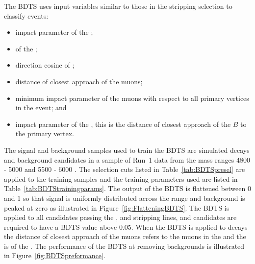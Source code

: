 The BDTS uses input variables similar to those in the stripping selection to classify events:
\begin{itemize}
\item impact parameter \chisqd of the \bsd;
\item \chivtx of the \bsd;
\item direction cosine of \bsd;
\item distance of closest approach of the muons;
\item minimum impact parameter \chisqd of the muons with respect to all primary vertices in the event; and 
\item impact parameter of the \bsd, this is the distance of closest approach of the $B$ to the primary vertex.
\end{itemize}
The signal and background samples used to train the BDTS are simulated \bsmumu decays and background candidates in a sample of Run~1 data from the mass ranges 4800 - 5000 \mevcc and 5500 - 6000 \mevcc. The selection cuts listed in Table~\ref{tab:BDTSpresel} are applied to the training samples and the training parameters used are listed in Table~\ref{tab:BDTStrainingparams}. The output of the BDTS is flattened between 0 and 1 so that signal is uniformly distributed across the range and background is peaked at zero as illustrated in Figure~\ref{fig:FlatteningBDTS}. The BDTS is applied to all candidates passing the \bmumu, \bhh and \bujpsik stripping lines, and candidates are required to have a BDTS value above 0.05. When the BDTS is applied to \bujpsik decays the distance of closest approach of the muons refers to the muons in the \jpsi and the \chivtx is of the \jpsi. %
The performance of the BDTS at removing backgrounds is illustrated in Figure~\ref{fig:BDTSpreformance}. %

